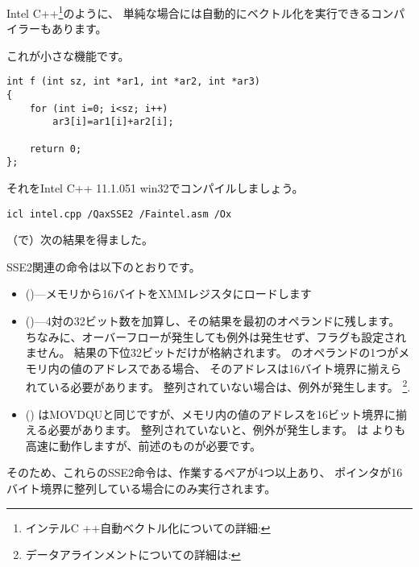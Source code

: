 Intel C++\footnote{インテルC ++自動ベクトル化についての詳細: \URLINTELVEC}のように、
単純な場合には自動的にベクトル化を実行できるコンパイラーもあります。

これが小さな機能です。

\begin{lstlisting}[style=customc]
int f (int sz, int *ar1, int *ar2, int *ar3)
{
	for (int i=0; i<sz; i++)
		ar3[i]=ar1[i]+ar2[i];

	return 0;
};
\end{lstlisting}


それをIntel C++ 11.1.051 win32でコンパイルしましょう。

\begin{verbatim}
icl intel.cpp /QaxSSE2 /Faintel.asm /Ox
\end{verbatim}

（\IDA で）次の結果を得ました。



SSE2関連の命令は以下のとおりです。
\begin{itemize}
\item
\MOVDQU ()---メモリから16バイトをXMMレジスタにロードします

\item
\PADDD ()---4対の32ビット数を加算し、その結果を最初のオペランドに残します。
ちなみに、オーバーフローが発生しても例外は発生せず、フラグも設定されません。
結果の下位32ビットだけが格納されます。 
\PADDD のオペランドの1つがメモリ内の値のアドレスである場合、
そのアドレスは16バイト境界に揃えられている必要があります。
整列されていない場合は、例外が発生します。
\footnote{データアラインメントについての詳細は: \URLWPDA}.

\item
\MOVDQA ()
はMOVDQUと同じですが、メモリ内の値のアドレスを16ビット境界に揃える必要があります。
整列されていないと、例外が発生します。 
\MOVDQA は \MOVDQU よりも高速に動作しますが、前述のものが必要です。

\end{itemize}

そのため、これらのSSE2命令は、作業するペアが4つ以上あり、
ポインタが16バイト境界に整列している場合にのみ実行されます。

